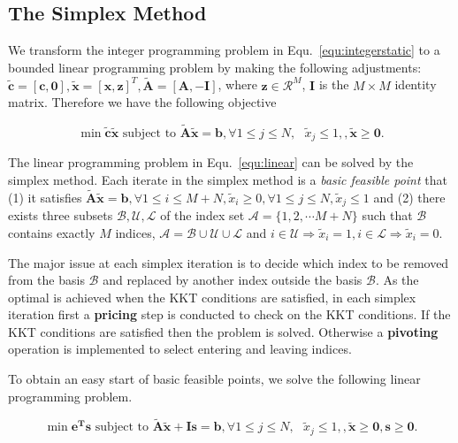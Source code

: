 \documentclass[envcountsame]{llncs}
\begin{document}
\subsection{The Simplex Method}
We transform the integer programming problem in Equ.~\ref{equ:integerstatic} to a bounded linear programming problem by making the following adjustments: $\tilde{\mathbf{c}}=[\mathbf{c},\mathbf{0}],\tilde{\mathbf{x}}=[\mathbf{x},\mathbf{z}]^T,\tilde{\mathbf{A}}=[\mathbf{A},-\mathbf{I}]$, where $\mathbf{z}\in\mathcal{R}^M$, $ \mathbf{I}$ is the $M\times M$ identity matrix. Therefore we have the following objective

\vspace{-0.3cm}
\begin{equation}\label{equ:linear}
\min \tilde{\mathbf{c}}\tilde{\mathbf{x}}\textrm{ subject to } \tilde{\mathbf{A}}\tilde{\mathbf{x}} = \mathbf{b}, \forall 1\leq j\leq N,\textrm{ } \tilde{x}_j \leq 1, ,\tilde{\mathbf{x}}\geq \mathbf{0}.
\end{equation}
\vspace{-0.6cm}

The linear programming problem in Equ.~\ref{equ:linear} can be solved by the simplex method. Each iterate in the simplex method is a \emph{basic feasible point} that (1) it satisfies $\tilde{\mathbf{A}}\tilde{\mathbf{x}} = \mathbf{b}, \forall 1\leq i\leq M+N,\tilde{x}_i \geq 0,\forall 1\leq j\leq N, \tilde{x}_j \leq 1$ and (2) there exists three subsets $\mathcal{B,U,L}$ of the index set $\mathcal{A}=\{1,2,\cdots M+N\}$ such that $\mathcal{B}$ contains exactly $M$ indices, $\mathcal{A}=\mathcal{B}\cup \mathcal{U} \cup \mathcal{L}$ and $i \in \mathcal{U} \Rightarrow \tilde{x}_i=1,i \in \mathcal{L} \Rightarrow \tilde{x}_i=0$.

The major issue at each simplex iteration is to decide which index to be removed from the basis $\mathcal{B}$ and replaced by another index outside the basis $\mathcal{B}$.  As the optimal is achieved when the KKT conditions are satisfied, in each simplex iteration first  a \textbf{pricing} step is conducted to check on the KKT conditions.  If the KKT conditions are satisfied then the problem is solved. Otherwise a \textbf{pivoting} operation is implemented to select entering and leaving indices.

To obtain an easy start of basic feasible points, we solve the following linear programming problem.

\vspace{-0.6cm}
\begin{equation}\label{equ:linearphaseI}
\min \mathbf{e^{T}s} \textrm{ subject to } \tilde{\mathbf{A}}\tilde{\mathbf{x}} + \mathbf{Is} = \mathbf{b},  \forall 1\leq j\leq N,\textrm{ } \tilde{x}_j \leq 1, ,\tilde{\mathbf{x}}\geq \mathbf{0}, \mathbf{s}\geq \mathbf{0}.
\end{equation}
\vspace{-0.6cm}
\end{document}
